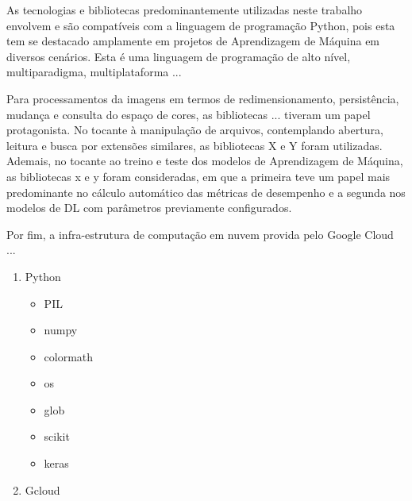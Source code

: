 As tecnologias e bibliotecas predominantemente utilizadas neste trabalho envolvem e são compatíveis com a linguagem de programação Python, pois esta tem se destacado amplamente em projetos de Aprendizagem de Máquina em diversos cenários. Esta é uma linguagem de programação  de alto nível, multiparadigma, multiplataforma ...

Para processamentos da imagens em termos de redimensionamento, persistência, mudança e consulta do espaço de cores, as bibliotecas ... tiveram um papel protagonista. No tocante à manipulação de arquivos, contemplando abertura, leitura e busca por extensões similares, as bibliotecas X e Y foram utilizadas. Ademais, no tocante ao treino e teste dos modelos de Aprendizagem de Máquina, as bibliotecas x e y foram consideradas, em que a primeira teve um papel mais predominante no cálculo automático das métricas de desempenho e a segunda nos modelos de DL com parâmetros previamente configurados.

Por fim, a infra-estrutura de computação em nuvem provida pelo Google Cloud ...

\begin{enumerate}
	\item Python
	\begin{itemize}
		\item PIL
		\item numpy
		\item colormath
		\item os
		\item glob
		\item scikit
		\item keras
	\end{itemize}
	\item Gcloud
\end{enumerate}
